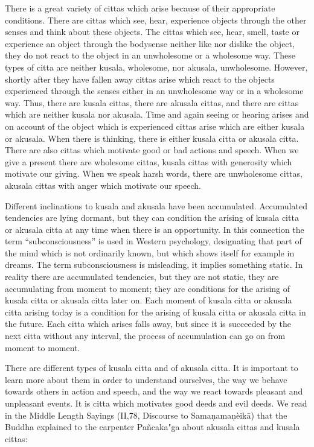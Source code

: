 \documentclass{book}
\begin{document}
There is a great variety of cittas which arise because of their
appropriate conditions. There are cittas which see, hear, experience
objects through the other senses and think about these objects. The
cittas which see, hear, smell, taste or experience an object through the
bodysense neither like nor dislike the object, they do not react to the
object in an unwholesome or a wholesome way. These types of citta are
neither kusala, wholesome, nor akusala, unwholesome. However, shortly
after they have fallen away cittas arise which react to the objects
experienced through the senses either in an unwholesome way or in a
wholesome way. Thus, there are kusala cittas, there are akusala cittas,
and there are cittas which are neither kusala nor akusala. Time and
again seeing or hearing arises and on account of the object which is
expe­rienced cittas arise which are either kusala or akusala. When
there is thinking, there is either kusala citta or akusala citta. There
are also cittas which motivate good or bad actions and speech. When we
give a present there are wholesome cittas, kusala cittas with generosity
which motivate our giving. When we speak harsh words, there are
unwholesome cittas, akusala cittas with anger which motivate our speech.

Different inclinations to kusala and akusala have been accumulated.
Accumulated tendencies are lying dormant, but they can condition the arising of kusala citta or akusala citta at any time when there is an opportunity. In this connection the term ``subconsciousness'' is used     in West­ern psychology, designating that part of the mind which is not
ordinarily known, but which shows itself for example in dreams. The term
subconsciousness is misleading, it implies something static. In reality
there are accumulated tendencies, but they are not static, they are
accumulating from moment to moment; they are conditions for the arising
of kusala citta or akusala citta later on. Each moment of kusala citta
or akusala citta arising today is a condition for the arising of kusala
citta or akusala citta in the future. Each citta which arises falls
away, but since it is succeeded by the next citta without any interval,
the process of accumulation can go on from moment to moment.

There are different types of kusala citta and of akusala citta. It is
important to learn more about them in order to understand ourselves, the
way we behave towards others in action and speech, and the way we react
towards pleasant and unpleasant events. It is citta which motivates good
deeds and evil deeds. We read in the Middle Length Sayings (II,78, Discourse to Samaṇamaṇèikā) that the Buddha explained to the
carpenter Pañcaka"ga about akusala cittas and kusala cittas:
\end{document}

